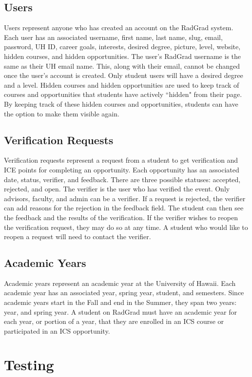 \subsection{Users}
Users represent anyone who has created an account on the RadGrad system. Each user has an associated username, first name, last name, slug, email, password, UH ID, career goals, interests, desired degree, picture, level, website, hidden courses, and hidden opportunities. The user's RadGrad username is the same as their UH email name. This, along with their email, cannot be changed once the user's account is created. Only student users will have a desired degree and a level. Hidden courses and hidden opportunities are used to keep track of courses and opportunities that students have actively ``hidden" from their page. By keeping track of these hidden courses and opportunities, students can have the option to make them visible again.

\subsection{Verification Requests}
Verification requests represent a request from a student to get verification and ICE points for completing an opportunity. Each opportunity has an associated date, status, verifier, and feedback. There are three possible statuses: accepted, rejected, and open. The verifier is the user who has verified the event. Only advisors, faculty, and admin can be a verifier. If a request is rejected, the verifier can add reasons for the rejection in the feedback field. The student can then see the feedback and the results of the verification. If the verifier wishes to reopen the verification request, they may do so at any time. A student who would like to reopen a request will need to contact the verifier.  

\subsection{Academic Years}
Academic years represent an academic year at the University of Hawaii. Each academic year has an associated year, spring year, student, and semesters. Since academic years start in the Fall and end in the Summer, they span two years: year, and spring year. A student on RadGrad must have an academic year for each year, or portion of a year, that they are enrolled in an ICS course or participated in an ICS opportunity.

\section{Testing}

